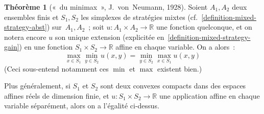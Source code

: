 \documentclass[12pt,a4paper]{article}
\theoremstyle{definition}
\newtheorem{thm}[comcnt]{Théorème}
\begin{document}
\begin{thm}[« du minimax », J. von Neumann, 1928]\label{theorem-minimax}
Soient $A_1,A_2$ deux ensembles finis et $S_1,S_2$ les simplexes de
stratégies mixtes (cf. \ref{definition-mixed-strategy-abst})
sur $A_1,A_2$ ; soit $u\colon A_1\times A_2 \to \mathbb{R}$ une
fonction quelconque, et on notera encore $u$ son unique extension
(explicitée en \ref{definition-mixed-strategy-gain}) en une fonction
$S_1\times S_2 \to \mathbb{R}$ affine en chaque variable.  On a
alors :
\[
\max_{x\in S_1} \min_{y\in S_2} u(x,y) =
\min_{y\in S_2} \max_{x\in S_1} u(x,y)
\]
(Ceci sous-entend notamment ces $\min$ et $\max$ existent bien.)

Plus généralement, si $S_1$ et $S_2$ sont deux convexes compacts dans
des espaces affines réels de dimension finie, et $u\colon S_1\times
S_2 \to \mathbb{R}$ une application affine en chaque variable
séparément, alors on a l'égalité ci-dessus.
\end{thm}
\end{document}
